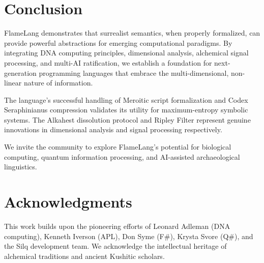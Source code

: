 \documentclass[11pt,a4paper]{article}
\begin{document}
\section{Conclusion}

FlameLang demonstrates that surrealist semantics, when properly formalized, can provide powerful abstractions for emerging computational paradigms. By integrating DNA computing principles, dimensional analysis, alchemical signal processing, and multi-AI ratification, we establish a foundation for next-generation programming languages that embrace the multi-dimensional, non-linear nature of information.

The language's successful handling of Meroitic script formalization and Codex Seraphinianus compression validates its utility for maximum-entropy symbolic systems. The Alkahest dissolution protocol and Ripley Filter represent genuine innovations in dimensional analysis and signal processing respectively.

We invite the community to explore FlameLang's potential for biological computing, quantum information processing, and AI-assisted archaeological linguistics.

\section*{Acknowledgments}

This work builds upon the pioneering efforts of Leonard Adleman (DNA computing), Kenneth Iverson (APL), Don Syme (F\#), Krysta Svore (Q\#), and the Silq development team. We acknowledge the intellectual heritage of alchemical traditions and ancient Kushitic scholars.
\end{document}

